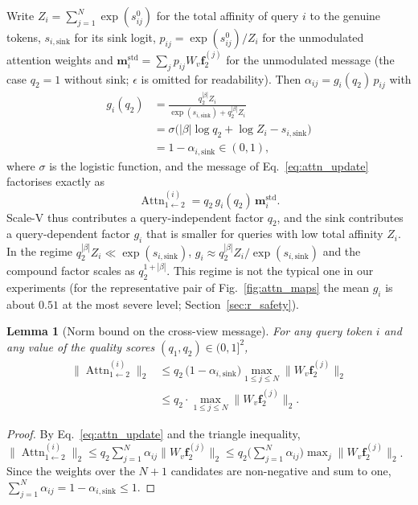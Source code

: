 \documentclass[final,5p,times,twocolumn,authoryear]{elsarticle}
\newcommand{\Attn}[1]{\operatorname{Attn}_{1\leftarrow 2}^{(#1)}}
\theoremstyle{plain}
\newtheorem{lemma}{Lemma}
\theoremstyle{remark}
\begin{document}
Write $Z_i = \sum_{j=1}^N \exp(s_{ij}^{0})$ for the total affinity of query $i$ to the genuine tokens, $s_{i,\text{sink}}$ for its sink logit, $p_{ij} = \exp(s_{ij}^{0})/Z_i$ for the unmodulated attention weights and $\mathbf{m}_i^{\text{std}} = \sum_j p_{ij} W_v \mathbf{f}_2^{(j)}$ for the unmodulated message (the case $q_2 = 1$ without sink; $\epsilon$ is omitted for readability). Then $\alpha_{ij} = g_i(q_2)\,p_{ij}$ with
\begin{equation}
\begin{split}
  g_i(q_2) &= \frac{q_2^{|\beta|} Z_i}{\exp(s_{i,\text{sink}}) + q_2^{|\beta|} Z_i} \\
  &= \sigma\!\big(|\beta|\log q_2 + \log Z_i - s_{i,\text{sink}}\big) \\
  &= 1 - \alpha_{i,\text{sink}} \in (0,1),
\end{split}
\end{equation}
where $\sigma$ is the logistic function, and the message of Eq.~\eqref{eq:attn_update} factorises exactly as
\begin{equation}
  \Attn{i} = q_2\, g_i(q_2)\, \mathbf{m}_i^{\text{std}} .
  \label{eq:message_factorization}
\end{equation}
Scale-V thus contributes a query-independent factor $q_2$, and the sink contributes a query-dependent factor $g_i$ that is smaller for queries with low total affinity $Z_i$. In the regime $q_2^{|\beta|} Z_i \ll \exp(s_{i,\text{sink}})$, $g_i \approx q_2^{|\beta|} Z_i/\exp(s_{i,\text{sink}})$ and the compound factor scales as $q_2^{1+|\beta|}$. This regime is not the typical one in our experiments (for the representative pair of Fig.~\ref{fig:attn_maps} the mean $g_i$ is about $0.51$ at the most severe level; Section~\ref{sec:r_safety}).

\begin{lemma}[Norm bound on the cross-view message]
\label{lem:1}
For any query token $i$ and any value of the quality scores $(q_1,q_2)\in(0,1]^2$,
\begin{equation}
\begin{split}
  \|\Attn{i}\|_2 &\le q_2\,\bigl(1-\alpha_{i,\text{sink}}\bigr)\max_{1 \le j \le N} \|W_v \mathbf{f}_2^{(j)}\|_2 \\
  &\le q_2 \cdot \max_{1 \le j \le N} \|W_v \mathbf{f}_2^{(j)}\|_2 .
\end{split}
  \label{eq:lemma_bound}
\end{equation}
\end{lemma}
\begin{proof}
By Eq.~\eqref{eq:attn_update} and the triangle inequality, $\|\Attn{i}\|_2 \le q_2 \sum_{j=1}^N \alpha_{ij}\|W_v \mathbf{f}_2^{(j)}\|_2 \le q_2 \bigl(\sum_{j=1}^N \alpha_{ij}\bigr)\max_j\|W_v \mathbf{f}_2^{(j)}\|_2$. Since the weights over the $N+1$ candidates are non-negative and sum to one, $\sum_{j=1}^N \alpha_{ij} = 1-\alpha_{i,\text{sink}} \le 1$.
\end{proof}
\end{document}
